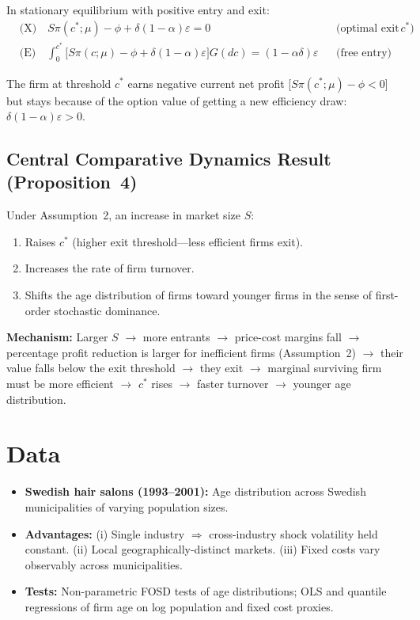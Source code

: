In stationary equilibrium with positive entry and exit:
\begin{align}
  &\text{(X)}\quad S\pi(c^*;\mu)-\phi+\delta(1-\alpha)\varepsilon=0
    &&\text{(optimal exit at threshold }c^*\text{)} \\
  &\text{(E)}\quad \int_0^{c^*}\!\bigl[S\pi(c;\mu)-\phi+\delta(1-\alpha)\varepsilon\bigr]G(dc)
    = (1-\alpha\delta)\varepsilon
    &&\text{(free entry)}
\end{align}

The firm at threshold $c^*$ earns negative current net profit
[$S\pi(c^*;\mu)-\phi<0$] but stays because of the option value of getting
a new efficiency draw: $\delta(1-\alpha)\varepsilon>0$.

\subsection*{Central Comparative Dynamics Result (Proposition~4)}

Under Assumption~2, an increase in market size $S$:
\begin{enumerate}
  \item Raises $c^*$ (higher exit threshold---less efficient firms exit).
  \item Increases the rate of firm turnover.
  \item Shifts the age distribution of firms toward younger firms in the
    sense of first-order stochastic dominance.
\end{enumerate}

\textbf{Mechanism:} Larger $S$ $\to$ more entrants $\to$ price-cost margins
fall $\to$ percentage profit reduction is larger for inefficient firms
(Assumption~2) $\to$ their value falls below the exit threshold $\to$ they
exit $\to$ marginal surviving firm must be more efficient $\to$ $c^*$ rises
$\to$ faster turnover $\to$ younger age distribution.

\section{Data}

\begin{itemize}
  \item \textbf{Swedish hair salons (1993--2001):} Age distribution across
    Swedish municipalities of varying population sizes.
  \item \textbf{Advantages:} (i) Single industry $\Rightarrow$ cross-industry
    shock volatility held constant. (ii) Local geographically-distinct markets.
    (iii) Fixed costs vary observably across municipalities.
  \item \textbf{Tests:} Non-parametric FOSD tests of age distributions;
    OLS and quantile regressions of firm age on log population and fixed cost
    proxies.
\end{itemize}

